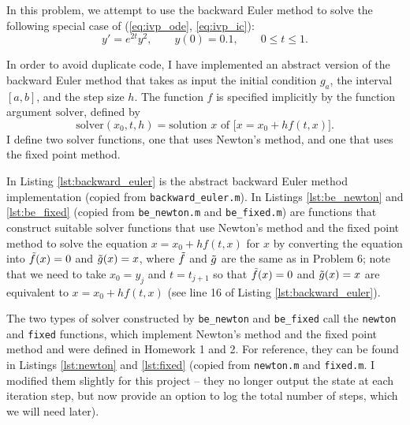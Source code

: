 \documentclass{homework}
\begin{document}
	\question
	In this problem, we attempt to use the backward Euler method to solve the following special case of (\ref{eq:ivp_ode}, \ref{eq:ivp_ic}):
	\begin{equation}
		\label{eq:p8:ode}
		y' = e^{2t}y^2, \qquad y(0) = 0.1, \qquad 0\le t\le 1.
	\end{equation}
	\begin{alphaparts}
		\questionpart
		\newcommand{\solver}{\mathrm{solver}}
		In order to avoid duplicate code, I have implemented an abstract version of the backward Euler method that takes as input the initial condition $g_a$, the interval $[a,b]$, and the step size $h$. The function $f$ is specified implicitly by the function argument $\solver$, defined by
		\begin{equation}
			\solver(x_0, t, h) = \text{solution $x$ of } \big[x = x_0 + hf(t,x)\big].
		\end{equation}
		I define two solver functions, one that uses Newton's method, and one that uses the fixed point method. 
		
		In Listing \ref{lst:backward_euler} is the abstract backward Euler method implementation (copied from \verb*|backward_euler.m|). In Listings \ref{lst:be_newton} and \ref{lst:be_fixed} (copied from \verb*|be_newton.m| and \verb*|be_fixed.m|) are functions that construct suitable $\solver$ functions that use Newton's method and the fixed point method to solve the equation $x = x_0 + hf(t,x)$ for $x$ by converting the equation into $\tilde{f}(x) = 0$ and $\tilde{g}(x) = x$, where $\tilde{f}$ and $\tilde{g}$ are the same as in Problem 6; note that we need to take $x_0 = y_j$ and $t = t_{j+1}$ so that $\tilde{f}(x) = 0$ and $\tilde{g}(x) = x$ are equivalent to $x = x_0 + hf(t,x)$ (see line 16 of Listing \ref{lst:backward_euler}).
		
		
		
		
		
		
		
		The two types of $\solver$ constructed by \verb*|be_newton| and \verb*|be_fixed| call the \verb*|newton| and \verb*|fixed| functions, which implement Newton's method and the fixed point method and were defined in Homework 1 and 2. For reference, they can be found in Listings \ref{lst:newton} and \ref{lst:fixed} (copied from \verb*|newton.m| and \verb*|fixed.m|. I modified them slightly for this project -- they no longer output the state at each iteration step, but now provide an option to log the total number of steps, which we will need later).
		

\end{alphaparts}
\end{document}
